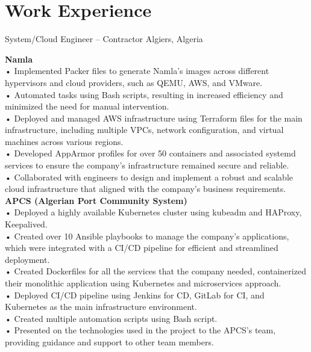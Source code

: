 \documentclass{cv}
\begin{document}


\section{Work Experience}

{System/Cloud Engineer -- Contractor}
{Algiers, Algeria\vspace{.3cm}}
{

  \textbf{Namla} \\
  • Implemented Packer files to generate Namla's images across different hypervisors and cloud providers, such as QEMU, AWS, and VMware.\\
  • Automated tasks using Bash scripts, resulting in increased efficiency and minimized the need for manual intervention.\\
  • Deployed and managed AWS infrastructure using Terraform files for the main infrastructure, including multiple VPCs, network configuration, and virtual machines across various regions.\\
  • Developed AppArmor profiles for over 50 containers and associated systemd services to ensure the company's infrastructure remained secure and reliable.\\
  • Collaborated with engineers to design and implement a robust and scalable cloud infrastructure that aligned with the company's business requirements.\\

  \textbf{APCS (Algerian Port Community System)} \\
  • Deployed a highly available Kubernetes cluster using kubeadm and HAProxy, Keepalived.\\
  • Created over 10 Ansible playbooks to manage the company's applications, which were integrated with a CI/CD pipeline for efficient and streamlined deployment.\\
  • Created Dockerfiles for all the services that the company needed, containerized their monolithic application using Kubernetes and microservices approach.\\
  • Deployed CI/CD pipeline using Jenkins for CD, GitLab for CI, and Kubernetes as the main infrastructure environment.\\
  • Created multiple automation scripts using Bash script.\\
  • Presented on the technologies used in the project to the APCS's team, providing guidance and support to other team members.\\

}
\end{document}
